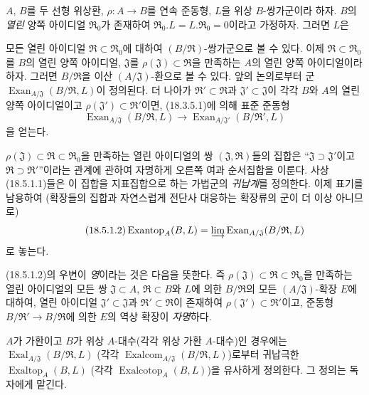 \begin{env}[18.5.1]
\label{0.18.5.1-fr}
$A$, $B$를 두 선형 위상환, $\rho:A\to B$를 연속 준동형,
$L$을 위상 $B$-쌍가군이라 하자. $B$의 \emph{열린} 양쪽 아이디얼
$\mathfrak R_0$가 존재하여
$\mathfrak R_0.L=L.\mathfrak R_0=0$이라고 가정하자. 그러면 $L$은


모든 열린 아이디얼 $\mathfrak R\subset\mathfrak R_0$에 대하여
$(B/\mathfrak R)$-쌍가군으로 볼 수 있다. 이제
$\mathfrak R\subset\mathfrak R_0$를 $B$의 열린 양쪽 아이디얼,
$\mathfrak J$를 $\rho(\mathfrak J)\subset\mathfrak R$을 만족하는
$A$의 열린 양쪽 아이디얼이라 하자. 그러면 $B/\mathfrak R$을
이산 $(A/\mathfrak J)$-환으로 볼 수 있다. 앞의 논의로부터 군
$\operatorname{Exan}_{A/\mathfrak J}(B/\mathfrak R,L)$이 정의된다.
더 나아가 $\mathfrak R'\subset\mathfrak R$과
$\mathfrak J'\subset\mathfrak J$이 각각 $B$와 $A$의 열린 양쪽
아이디얼이고 $\rho(\mathfrak J')\subset\mathfrak R'$이면,
(18.3.5.1)에 의해 표준 준동형
\begin{equation}
\label{0.18.5.1.1-fr}
\tag{18.5.1.1}
  \operatorname{Exan}_{A/\mathfrak J}(B/\mathfrak R,L)
  \longrightarrow
  \operatorname{Exan}_{A/\mathfrak J'}(B/\mathfrak R',L)
\end{equation}
을 얻는다.

$\rho(\mathfrak J)\subset\mathfrak R\subset\mathfrak R_0$을 만족하는
열린 아이디얼의 쌍 $(\mathfrak J,\mathfrak R)$들의 집합은
``$\mathfrak J\supset\mathfrak J'$이고
$\mathfrak R\supset\mathfrak R'$''이라는 관계에 관하여 자명하게
오른쪽 여과 순서집합을 이룬다. 사상 (18.5.1.1)들은 이 집합을
지표집합으로 하는 가법군의 \emph{귀납계}를 정의한다. 이제 표기를 남용하여
(확장들의 집합과 자연스럽게 전단사 대응하는 확장류의 군이 더 이상
아니므로)
\begin{equation}
\label{0.18.5.1.2-fr}
\tag{18.5.1.2}
  \operatorname{Exantop}_A(B,L)
  =\varinjlim\operatorname{Exan}_{A/\mathfrak J}(B/\mathfrak R,L)
\end{equation}
로 놓는다.

(18.5.1.2)의 우변이 \emph{영}이라는 것은 다음을 뜻한다. 즉
$\rho(\mathfrak J)\subset\mathfrak R\subset\mathfrak R_0$을 만족하는
열린 아이디얼의 모든 쌍 $\mathfrak J\subset A$,
$\mathfrak R\subset B$와 $L$에 의한 $B/\mathfrak R$의 모든
$(A/\mathfrak J)$-확장 $E$에 대하여, 열린 아이디얼
$\mathfrak J'\subset\mathfrak J$과
$\mathfrak R'\subset\mathfrak R$이 존재하여
$\rho(\mathfrak J')\subset\mathfrak R'$이고, 준동형
$B/\mathfrak R'\to B/\mathfrak R$에 의한 $E$의 역상 확장이
\emph{자명}하다.

$A$가 가환이고 $B$가 위상 $A$-대수(각각 위상 가환 $A$-대수)인
경우에는 $\operatorname{Exal}_{A/\mathfrak J}(B/\mathfrak R,L)$
(각각 $\operatorname{Exalcom}_{A/\mathfrak J}(B/\mathfrak R,L)$)로부터
귀납극한 $\operatorname{Exaltop}_A(B,L)$
(각각 $\operatorname{Exalcotop}_A(B,L)$)을 유사하게 정의한다.
그 정의는 독자에게 맡긴다.
\end{env}

